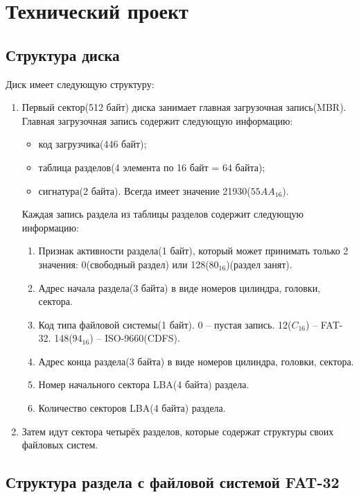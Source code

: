 \section{Технический проект}

\subsection{Структура диска}

Диск имеет следующую структуру:

\begin{enumerate}
\item Первый сектор(512 байт) диска занимает главная загрузочная запись(MBR). Главная загрузочная запись содержит следующую информацию:

	\begin{itemize}
	\item код загрузчика(446 байт);
	\item таблица разделов(4 элемента по 16 байт = 64 байта);
	\item сигнатура(2 байта). Всегда имеет значение 21930($55AA_{16}$).
	\end{itemize}
	
Каждая запись раздела из таблицы разделов содержит следующую информацию:

	\begin{enumerate}
	\item Признак активности раздела(1 байт), который может принимать только 2 значения: 0(свободный раздел) или 128($80_{16}$)(раздел занят).
	\item Адрес начала раздела(3 байта) в виде номеров цилиндра, головки, сектора.
	\item Код типа файловой системы(1 байт). 0 -- пустая запись. 12($C_{16}$) -- FAT-32. 148($94_{16}$) -- ISO-9660(CDFS).
	\item Адрес конца раздела(3 байта) в виде номеров цилиндра, головки, сектора.
	\item Номер начального сектора LBA(4 байта) раздела.
	\item Количество секторов LBA(4 байта) раздела.
	\end{enumerate}
	
\item Затем идут сектора четырёх разделов, которые содержат структуры своих файловых систем.
\end{enumerate}

\subsection{Структура раздела с файловой системой FAT-32}


